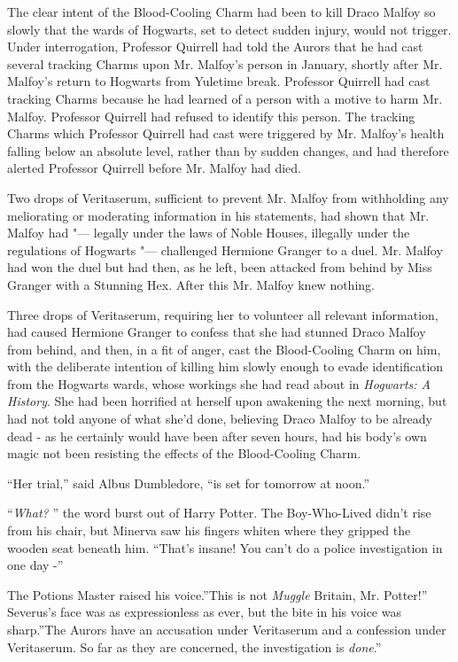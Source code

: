 The clear intent of the Blood-Cooling Charm had been to kill Draco
Malfoy so slowly that the wards of Hogwarts, set to detect sudden
injury, would not trigger. Under interrogation, Professor Quirrell had
told the Aurors that he had cast several tracking Charms upon Mr.
Malfoy's person in January, shortly after Mr. Malfoy's return to
Hogwarts from Yuletime break. Professor Quirrell had cast tracking
Charms because he had learned of a person with a motive to harm Mr.
Malfoy. Professor Quirrell had refused to identify this person. The
tracking Charms which Professor Quirrell had cast were triggered by Mr.
Malfoy's health falling below an absolute level, rather than by sudden
changes, and had therefore alerted Professor Quirrell before Mr. Malfoy
had died.

Two drops of Veritaserum, sufficient to prevent Mr. Malfoy from
withholding any meliorating or moderating information in his statements,
had shown that Mr. Malfoy had "--- legally under the laws of Noble Houses,
illegally under the regulations of Hogwarts "--- challenged Hermione
Granger to a duel. Mr. Malfoy had won the duel but had then, as he left,
been attacked from behind by Miss Granger with a Stunning Hex. After
this Mr. Malfoy knew nothing.

Three drops of Veritaserum, requiring her to volunteer all relevant
information, had caused Hermione Granger to confess that she had stunned
Draco Malfoy from behind, and then, in a fit of anger, cast the
Blood-Cooling Charm on him, with the deliberate intention of killing him
slowly enough to evade identification from the Hogwarts wards, whose
workings she had read about in \emph{Hogwarts: A History}. She had been
horrified at herself upon awakening the next morning, but had not told
anyone of what she'd done, believing Draco Malfoy to be already dead -
as he certainly would have been after seven hours, had his body's own
magic not been resisting the effects of the Blood-Cooling Charm.

``Her trial,'' said Albus Dumbledore, ``is set for tomorrow at noon.''

``\emph{What?} '' the word burst out of Harry Potter. The Boy-Who-Lived
didn't rise from his chair, but Minerva saw his fingers whiten where
they gripped the wooden seat beneath him. ``That's insane! You can't do
a police investigation in one day -''

The Potions Master raised his voice.''This is not \emph{Muggle} Britain,
Mr. Potter!'' Severus's face was as expressionless as ever, but the bite
in his voice was sharp.''The Aurors have an accusation under Veritaserum
and a confession under Veritaserum. So far as they are concerned, the
investigation is \emph{done}.''

